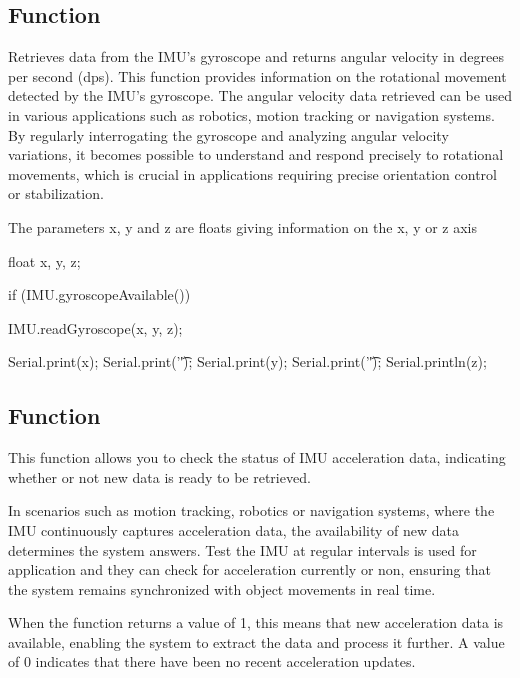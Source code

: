 \subsection{Function }

Retrieves data from the IMU's gyroscope and returns angular velocity in degrees per second (dps). This function provides information on the rotational movement detected by the IMU's gyroscope. The angular velocity data retrieved can be used in various applications such as robotics, motion tracking or navigation systems. By regularly interrogating the gyroscope and analyzing angular velocity variations, it becomes possible to understand and respond precisely to rotational movements, which is crucial in applications requiring precise orientation control or stabilization. \cite{adafruit_lsm9ds1:2024}

The parameters x, y and z are floats giving information on the x, y or z axis 

\begin{Arduino}
	float x, y, z;
	
	if (IMU.gyroscopeAvailable()) {
		IMU.readGyroscope(x, y, z);
		
		Serial.print(x);
		Serial.print('\t');
		Serial.print(y);
		Serial.print('\t');
		Serial.println(z);	}
\end{Arduino}



\subsection{Function }

This function allows you to check the status of IMU acceleration data, indicating whether or not new data is ready to be retrieved.

In scenarios such as motion tracking, robotics or navigation systems, where the IMU continuously captures acceleration data, the availability of new data determines the system answers. Test the IMU at regular intervals is used for application and they can check for acceleration currently or non, ensuring that the system remains synchronized with object movements in real time. \cite{adafruit_lsm9ds1:2024}

When the function returns a value of 1, this means that new acceleration data is available, enabling the system to extract the data and process it further. A value of 0 indicates that there have been no recent acceleration updates.

